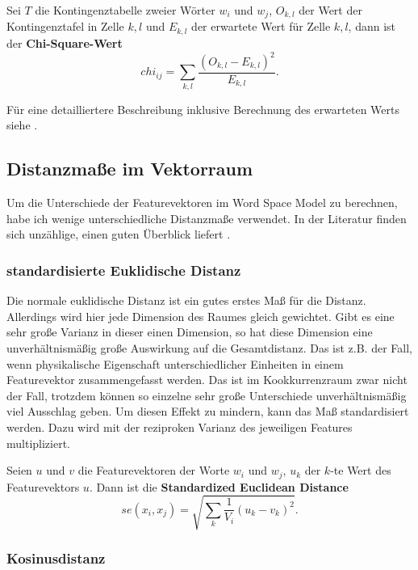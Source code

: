 \documentclass[11pt,numbers=noenddot]{scrartcl}
\begin{document}
Sei $T$ die Kontingenztabelle zweier Wörter $w_i$ und $w_j$, $O_{k,l}$ der Wert der Kontingenztafel in Zelle $k,l$ und $E_{k,l}$ der erwartete Wert für Zelle $k,l$, dann ist der \textbf{Chi-Square-Wert}
\begin{equation*}
   chi_{ij} = \sum_{k,l} { \frac{ (O_{k,l} - E_{k,l})^2} {E_{k,l}}  }.
\end{equation*}

Für eine detailliertere Beschreibung inklusive Berechnung des erwarteten Werts siehe \citet[S. 169ff.]{manning1999}.

\subsection{Distanzmaße im Vektorraum}

Um die Unterschiede der Featurevektoren im Word Space Model zu berechnen, habe ich wenige unterschiedliche Distanzmaße verwendet. In der Literatur finden sich unzählige, einen guten Überblick liefert \citet{cha2007comprehensive}.

\subsubsection{standardisierte Euklidische Distanz} \label{eucl}

Die normale euklidische Distanz ist ein gutes erstes Maß für die Distanz. Allerdings wird hier jede Dimension des Raumes gleich gewichtet. Gibt es eine sehr große Varianz in dieser einen Dimension, so hat diese Dimension eine unverhältnismäßig große Auswirkung auf die Gesamtdistanz. Das ist z.B. der Fall, wenn physikalische Eigenschaft unterschiedlicher Einheiten in einem Featurevektor zusammengefasst werden. Das ist im Kookkurrenzraum zwar nicht der Fall, trotzdem können so einzelne sehr große Unterschiede unverhältnismäßig viel Ausschlag geben. Um diesen Effekt zu mindern, kann das Maß standardisiert werden. Dazu wird mit der reziproken Varianz des jeweiligen Features multipliziert.

Seien $u$ und $v$ die Featurevektoren der Worte $w_i$ und $w_j$, $u_k$ der $k$-te Wert des Featurevektors $u$. Dann ist die \textbf{Standardized Euclidean Distance}
$$
    se(x_i, x_j) = \sqrt{ \sum_{k} {\frac{1}{V_i}{ (u_k - v_k)^2 }} }.
$$

\subsubsection{Kosinusdistanz} \label{cosi}
\end{document}
